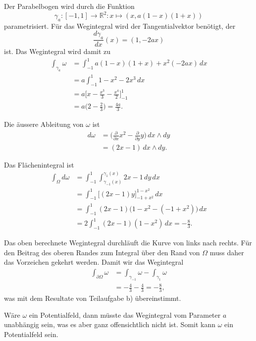 \begin{loesung}
Der Parabelbogen wird durch die Funktion
\[
\gamma_a
\colon
[-1,1]\to\mathbb{R}^2
:
x\mapsto (x,a(1-x)(1+x))
\]
parametrisiert.
Für das Wegintegral wird der Tangentialvektor benötigt, der
\[
\frac{d\gamma_a}{dx}(x)
=
(1,-2ax)
\]
ist.
Das Wegintegral wird damit zu
\begin{align*}
\int_{\gamma_a} \omega
&=
\int_{-1}^1 a(1-x)(1+x) + x^2 (-2ax) \,dx
\\
&=
a\int_{-1}^1 1-x^2-2x^3\,dx
\\
&=
a
\biggl[
x-\frac{x^3}{3}-\frac{x^4}{2}
\biggr]_{-1}^1
\\
&=
a\biggl(
2-\frac23
\biggr)
=
\frac{4a}{3}.
\end{align*}
\begin{teilaufgaben}
\item
Die äussere Ableitung von $\omega$ ist
\begin{align*}
d\omega
&=
\biggl(
\frac{\partial}{\partial x}x^2
-
\frac{\partial}{\partial y}y
\biggr)\,dx\wedge dy
\\
&=
(2x-1)
\,dx\wedge dy.
\end{align*}
\item
Das Flächenintegral ist
\begin{align*}
\int_{\Omega}
d\omega
&=
\int_{-1}^1
\int_{\gamma_{-1}(x)}^{\gamma_1(x)}
2x-1
\,dy
\,dx
\\
&=
\int_{-1}^1
\biggl[(2x-1)y\biggr]_{-1+x^2}^{1-x^2}
\,dx
\\
&=
\int_{-1}^1
(2x-1)
\bigl(
1-x^2-(-1+x^2)
\bigr)
\,dx
\\
&=
2
\int_{-1}^1
(2x-1)
(1-x^2)
\,dx
=
-\frac{8}{3}.
\end{align*}
\item
Das oben berechnete Wegintegral durchläuft die Kurve von links nach
rechts.
Für den Beitrag des oberen Randes zum Integral über den Rand von
$\Omega$ muss daher das Vorzeichen gekehrt werden.
Damit wir das Wegintegral
\begin{align*}
\int_{\partial\Omega} \omega
&=
\int_{\gamma_{-1}}\omega - \int_{\gamma_{1}}\omega
\\
&=
-\frac{4}{3}-\frac{4}{3}
=
-\frac{8}3,
\end{align*}
was mit dem Resultate von Teilaufgabe b) übereinstimmt.
\item
Wäre $\omega$ ein Potentialfeld, dann müsste das Wegintegral vom Parameter
$a$ unabhängig sein, was es aber ganz offensichtlich nicht ist.
Somit kann $\omega$ ein Potentialfeld sein.
\qedhere
\end{teilaufgaben}
\end{loesung}

